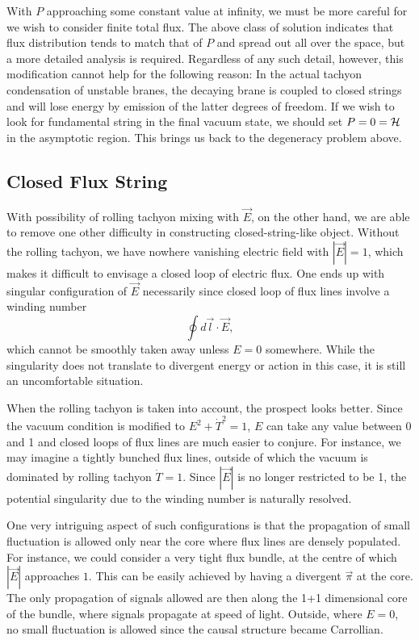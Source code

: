 \documentclass[a4paper,12pt]{article}
\begin{document}
With $P$ approaching some constant value at infinity, we must
be more careful for we wish to consider finite total flux. 
The above class of solution indicates that flux distribution
tends to match that of $P$ and spread out all over the space,
but a more detailed analysis is required.
Regardless of any such detail, however, this modification
cannot help for the 
following reason: In the  actual tachyon condensation of unstable
branes, the decaying brane is coupled to closed strings
and will lose energy by emission of the latter degrees of 
freedom. If we wish to look for fundamental string in the
final vacuum state, we should set $P=0={\cal H}$ in the
asymptotic region. This brings us back to  the degeneracy problem above.


\subsection{Closed Flux String}

With possibility of rolling tachyon mixing with $\vec E$, on the other 
hand, we are able to remove one other difficulty in constructing
closed-string-like
object. Without the rolling tachyon, we have nowhere vanishing electric
field with $|\vec E|=1$,
which makes it difficult to envisage a closed loop of electric flux. 
One ends
up with singular configuration of $\vec E$ necessarily since closed
loop of flux lines involve a winding number 
\begin{equation}
\oint d\vec l \cdot \vec E ,
\end{equation}
which cannot be smoothly taken away unless $E=0$ somewhere. While
the singularity does not translate to divergent energy or action
in this case, it is still an uncomfortable situation.

When the rolling tachyon is taken into account, the prospect looks
better.  
Since the vacuum condition is modified to $E^2+\dot T^2=1$,
$E$ can take any value between 0 and 1 and closed loops of flux 
lines are much easier to conjure. For instance, we may imagine a tightly  
bunched flux lines, outside of which the vacuum is dominated by rolling 
tachyon $\dot T=1$. Since $|\vec E|$ is no longer restricted to be 1, 
the potential singularity due to the winding number is naturally
resolved.  

One very intriguing aspect of such configurations is that
the  propagation
of small fluctuation is allowed only near the core where flux lines
are densely populated. For instance, we could consider a very tight
flux bundle, at the centre  of which $|\vec E|$ approaches $1$. This
can be easily achieved by having a divergent $\vec \pi$ at the core.
The only propagation of signals allowed are then along the 1+1 
dimensional core of the bundle, where signals propagate at speed of 
light. Outside, where $E=0$, no small fluctuation is allowed since
the causal structure became Carrollian.
\end{document}
